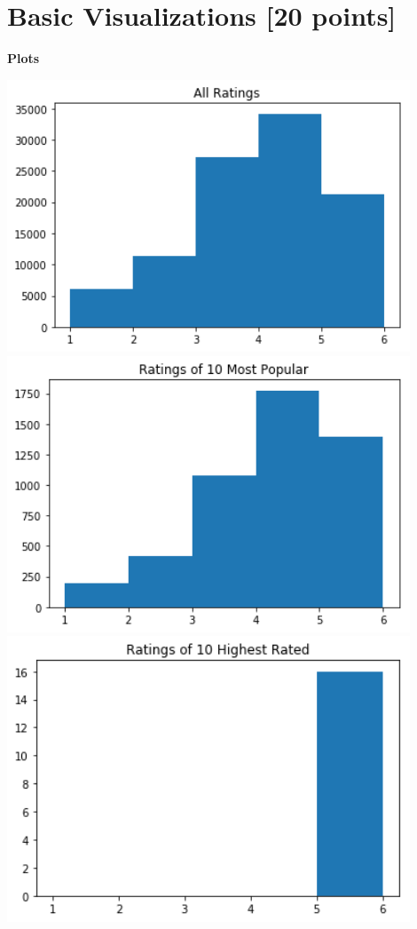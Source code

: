 \section{Basic Visualizations [20 points]}
\medskip
\noindent\textbf{Plots}\\
\begin{center}
	\includegraphics[width=12cm]{Pictures/Basic_all}
	\includegraphics[width=12cm]{Pictures/Basic_popular}
	\includegraphics[width=12cm]{Pictures/Basic_highest}

\end{center}
